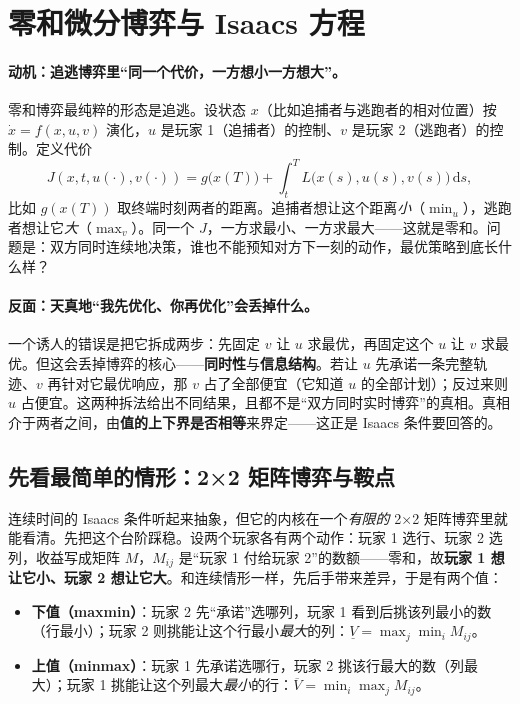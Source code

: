 \section{零和微分博弈与 Isaacs 方程}
\label{sec:dg-isaacs}

\paragraph{动机：追逃博弈里“同一个代价，一方想小一方想大”。}
零和博弈最纯粹的形态是追逃。设状态 $x$（比如追捕者与逃跑者的相对位置）按 $\dot x=f(x,u,v)$ 演化，$u$ 是玩家 1（追捕者）的控制、$v$ 是玩家 2（逃跑者）的控制。定义代价
\begin{equation}
  J(x,t,u(\cdot),v(\cdot))=g\big(x(T)\big)+\int_t^T L\big(x(s),u(s),v(s)\big)\,\mathrm ds,
  \label{eq:dg-cost}
\end{equation}
比如 $g(x(T))$ 取终端时刻两者的距离。追捕者想让这个距离\emph{小}（$\min_u$），逃跑者想让它\emph{大}（$\max_v$）。同一个 $J$，一方求最小、一方求最大——这就是零和。问题是：双方同时连续地决策，谁也不能预知对方下一刻的动作，最优策略到底长什么样？

\paragraph{反面：天真地“我先优化、你再优化”会丢掉什么。}
一个诱人的错误是把它拆成两步：先固定 $v$ 让 $u$ 求最优，再固定这个 $u$ 让 $v$ 求最优。但这会丢掉博弈的核心——\textbf{同时性}与\textbf{信息结构}。若让 $u$ 先承诺一条完整轨迹、$v$ 再针对它最优响应，那 $v$ 占了全部便宜（它知道 $u$ 的全部计划）；反过来则 $u$ 占便宜。这两种拆法给出不同结果，且都不是“双方同时实时博弈”的真相。真相介于两者之间，由\textbf{值的上下界是否相等}来界定——这正是 Isaacs 条件要回答的。

\subsection{先看最简单的情形：2×2 矩阵博弈与鞍点}
\label{sec:dg-matrix}
连续时间的 Isaacs 条件听起来抽象，但它的内核在一个\emph{有限的} 2×2 矩阵博弈里就能看清。先把这个台阶踩稳。设两个玩家各有两个动作：玩家 1 选行、玩家 2 选列，收益写成矩阵 $M$，$M_{ij}$ 是“玩家 1 付给玩家 2”的数额——零和，故\textbf{玩家 1 想让它小、玩家 2 想让它大}。和连续情形一样，先后手带来差异，于是有两个值：

\begin{itemize}
  \item \textbf{下值（maxmin）}：玩家 2 先“承诺”选哪列，玩家 1 看到后挑该列最小的数（行最小）；玩家 2 则挑能让这个行最小\emph{最大}的列：$\underline V=\max_j\min_i M_{ij}$。
  \item \textbf{上值（minmax）}：玩家 1 先承诺选哪行，玩家 2 挑该行最大的数（列最大）；玩家 1 挑能让这个列最大\emph{最小}的行：$\overline V=\min_i\max_j M_{ij}$。
\end{itemize}

